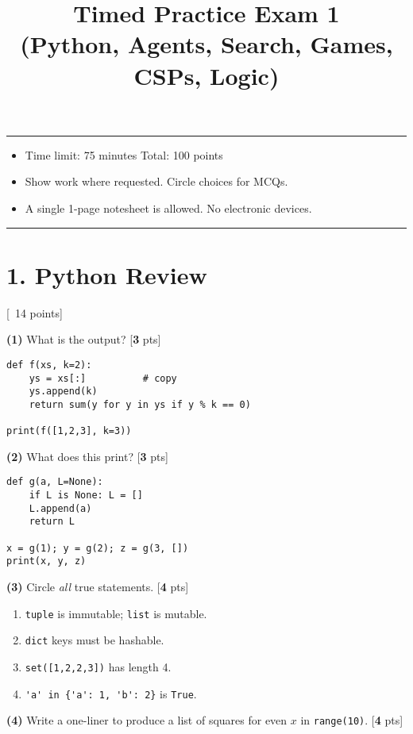 \documentclass[11pt]{article}
\title{\vspace{-1em}Timed Practice Exam 1\\
\normalsize (Python, Agents, Search, Games, CSPs, Logic)}
\date{}
\author{}
\newcommand{\pts}[1]{\hfill{\small[\textbf{#1} pts]}}
\begin{document}
\maketitle
\vspace{-2em}
\hrule
\begin{itemize}
    \item Time limit: 75 minutes \qquad Total: 100 points
    \item Show work where requested. Circle choices for MCQs.
    \item A single 1-page notesheet is allowed. No electronic devices.
\end{itemize}
\hrule
\vspace{1em}

\section*{1. Python Review} \hfill {\small[~14 points]}

\noindent\textbf{(1)} What is the output? \pts{3}

\begin{verbatim}
def f(xs, k=2):
    ys = xs[:]          # copy
    ys.append(k)
    return sum(y for y in ys if y % k == 0)

print(f([1,2,3], k=3))
\end{verbatim}

\noindent\textbf{(2)} What does this print? \pts{3}

\begin{verbatim}
def g(a, L=None):
    if L is None: L = []
    L.append(a)
    return L

x = g(1); y = g(2); z = g(3, [])
print(x, y, z)
\end{verbatim}

\noindent\textbf{(3)} Circle \emph{all} true statements. \pts{4}
\begin{enumerate}[label=(\alph*)]
\item \verb|tuple| is immutable; \verb|list| is mutable.
\item \verb|dict| keys must be hashable.
\item \verb|set([1,2,2,3])| has length 4.
\item \verb|'a' in {'a': 1, 'b': 2}| is \verb|True|.
\end{enumerate}

\noindent\textbf{(4)} Write a one-liner to produce a list of squares for even $x$ in \verb|range(10)|. \pts{4}
\end{document}
